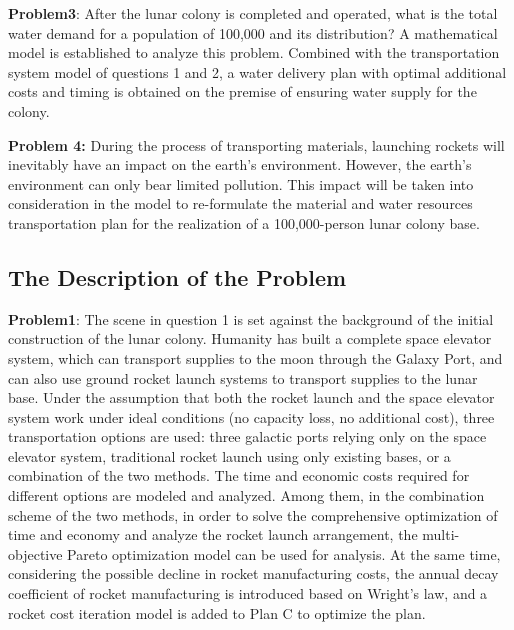 \textbf{Problem3}:
After the lunar colony is completed and operated, what is the total water demand for a population of 100,000 and its distribution? A mathematical model is established to analyze this problem. Combined with the transportation system model of questions 1 and 2, a water delivery plan with optimal additional costs and timing is obtained on the premise of ensuring water supply for the colony.

\textbf{Problem 4:}
During the process of transporting materials, launching rockets will inevitably have an impact on the earth's environment. However, the earth's environment can only bear limited pollution. This impact will be taken into consideration in the model to re-formulate the material and water resources transportation plan for the realization of a 100,000-person lunar colony base.


\subsection{The Description of the Problem} %

\textbf{Problem1}:
The scene in question 1 is set against the background of the initial construction of the lunar colony. Humanity has built a complete space elevator system, which can transport supplies to the moon through the Galaxy Port, and can also use ground rocket launch systems to transport supplies to the lunar base. Under the assumption that both the rocket launch and the space elevator system work under ideal conditions (no capacity loss, no additional cost), three transportation options are used: three galactic ports relying only on the space elevator system, traditional rocket launch using only existing bases, or a combination of the two methods. The time and economic costs required for different options are modeled and analyzed. Among them, in the combination scheme of the two methods, in order to solve the comprehensive optimization of time and economy and analyze the rocket launch arrangement, the multi-objective Pareto optimization model can be used for analysis. 
At the same time, considering the possible decline in rocket manufacturing costs, the annual decay coefficient of rocket manufacturing is introduced based on Wright's law, and a rocket cost iteration model is added to Plan C to optimize the plan.

